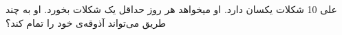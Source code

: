 علی 10 شکلات یکسان دارد. او میخواهد هر روز حداقل یک شکلات بخورد. او به چند طریق می‌تواند آذوقه‌ی خود را تمام کند؟